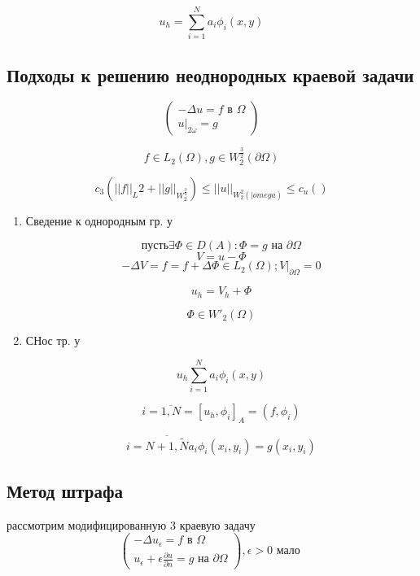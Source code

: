 \documentclass[12pt, a4paper]{article}
\begin{document}
\[ u_h = \sum_{i=1}^{N} a_i \phi_i (x, y) \]

\subsection{Подходы к решению неоднородных краевой задачи}

\[
\left(
    \begin{array}{c}
        - \Delta u = f \textrm{ в } \Omega \\
        u|_{2\omega} = g
    \end{array}
\right)
\]

\[ f \in L_2 (\Omega) , g \in W^{\frac{3}{2}}_2 (\partial \Omega) \]

\[ c_3 ({||f||}_L2 + {||g||}_{W_2^{\frac{3}{2}}}) \leq {||u||}_{W^2_2(|omega)} \leq c_u() \]

\begin{enumerate}
    \item Сведение к однородным гр. у

    \[ пусть  \exists \Phi \in  D(A): \Phi=g  \textrm{ на } \partial \Omega \]
    \[ V = u - \Phi \]
    \[ - \Delta V = f = f + \Delta \Phi \in L_2 (\Omega); V |_{\partial \Omega} = 0 \]

    \[ u_h = V_h + \Phi \]

    \[ \Phi \in {W'}_2 (\Omega) \]

    \item СНос тр. у

    \[ u_h \sum_{i=1}^{N} a_i \phi_i (x, y) \]

    \[ i = \overline{1, N} = [u_h, \phi_i]_A = (f, \phi_i) \]

    \[ i = \overline{N + 1, \widetilde{N}} a_i \phi_i (x_i, y_i) = g(x_i, y_i) \]

\end{enumerate}

\subsection{Метод штрафа}

рассмотрим модифицированную 3 краевую задачу
\[
\left(
    \begin{array}{c}
        - \Delta u_{\epsilon} = f \textrm{ в  } \Omega \\
        u_{\epsilon} + \epsilon \frac{\partial u}{\partial n} = g \textrm{ на  } \partial \Omega
    \end{array}
\right), \epsilon > 0 \textrm{ мало }
\]
\end{document}
